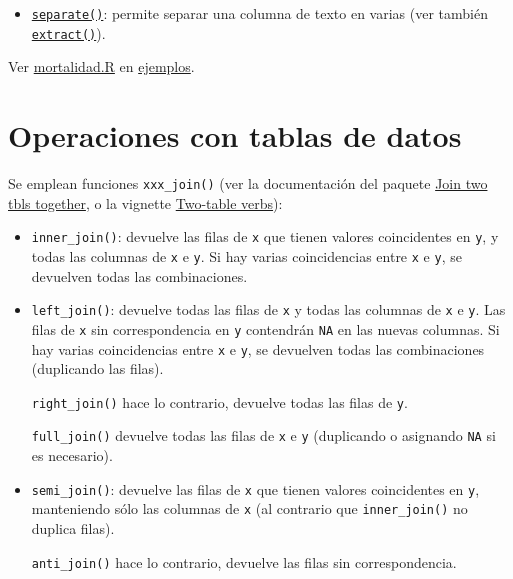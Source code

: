 \documentclass[
]{book}
\providecommand{\tightlist}{%
  \setlength{\itemsep}{0pt}\setlength{\parskip}{0pt}}
\theoremstyle{break}
\theoremstyle{nonumberplain}
\begin{document}
\begin{itemize}
\tightlist
\item
  \href{https://tidyr.tidyverse.org/reference/separate.html}{\texttt{separate()}}: permite separar una columna de texto en varias (ver también \href{https://tidyr.tidyverse.org/reference/extract.html}{\texttt{extract()}}).
\end{itemize}

Ver \href{ejemplos/mortalidad/mortalidad.R}{mortalidad.R} en \href{https://github.com/rubenfcasal/book_notasr/tree/main/ejemplos}{ejemplos}.

\hypertarget{dplyr-join}{%
\section{Operaciones con tablas de datos}\label{dplyr-join}}

Se emplean funciones \texttt{xxx\_join()} (ver la documentación del paquete
\href{https://dplyr.tidyverse.org/reference/join.html}{Join two tbls together},
o la vignette \href{https://dplyr.tidyverse.org/articles/two-table.html}{Two-table verbs}):

\begin{itemize}
\item
  \texttt{inner\_join()}: devuelve las filas de \texttt{x} que tienen valores coincidentes en \texttt{y},
  y todas las columnas de \texttt{x} e \texttt{y}. Si hay varias coincidencias entre \texttt{x} e \texttt{y},
  se devuelven todas las combinaciones.
\item
  \texttt{left\_join()}: devuelve todas las filas de \texttt{x} y todas las columnas de \texttt{x} e \texttt{y}.
  Las filas de \texttt{x} sin correspondencia en \texttt{y} contendrán \texttt{NA} en las nuevas columnas.
  Si hay varias coincidencias entre \texttt{x} e \texttt{y}, se devuelven todas las combinaciones
  (duplicando las filas).

  \texttt{right\_join()} hace lo contrario, devuelve todas las filas de \texttt{y}.

  \texttt{full\_join()} devuelve todas las filas de \texttt{x} e \texttt{y} (duplicando o asignando \texttt{NA} si es necesario).
\item
  \texttt{semi\_join()}: devuelve las filas de \texttt{x} que tienen valores coincidentes en \texttt{y},
  manteniendo sólo las columnas de \texttt{x} (al contrario que \texttt{inner\_join()} no duplica filas).

  \texttt{anti\_join()} hace lo contrario, devuelve las filas sin correspondencia.
\end{itemize}
\end{document}
